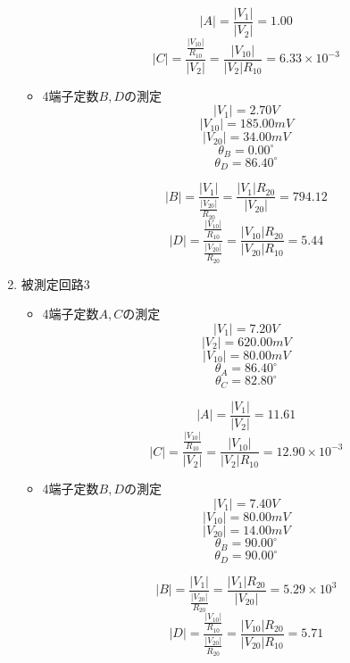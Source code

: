 \begin{enumerate}
\begin{itemize}
            $$
            |A|=\frac{\left|V_1\right|}{\left|V_2\right|}=1.00
            $$
            $$
            |C|=\frac{\frac{\left|V_{10}\right|}{R_{10}}}{\left|V_2\right|}=\frac{\left|V_{10}\right|}{\left|V_2\right| R_{10}}=6.33\times10^{-3}
            $$

            \item 4端子定数$B,D$の測定
            $$
            |V_1|=2.70V
            $$
            $$
            |V_{10}|=185.00mV
            $$
            $$
            |V_{20}|=34.00mV
            $$
            $$
            \theta_B=0.00^\circ
            $$
            $$
            \theta_D=86.40^\circ
            $$

            $$
            |B|=\frac{\left|V_1\right|}{\frac{\left|V_{20}\right|}{R_{20}}}=\frac{\left|V_1\right| R_{20}}{\left|V_{20}\right|}=794.12
            $$
            $$
            |D|=\frac{\frac{\left|V_{10}\right|}{R_{10}}}{\frac{\left|V_{20}\right|}{R_{20}}}=\frac{\left|V_{10}\right| R_{20}}{\left|V_{20}\right| R_{10}}=5.44
            $$
        \end{itemize}

        \newpage
        
        \item 被測定回路3
        \begin{itemize}
            \item 4端子定数$A,C$の測定
            $$
            |V_1|=7.20V
            $$
            $$
            |V_2|=620.00mV
            $$
            $$
            |V_{10}|=80.00mV
            $$
            $$
            \theta_A=86.40^\circ
            $$
            $$
            \theta_C=82.80^\circ
            $$

            $$
            |A|=\frac{\left|V_1\right|}{\left|V_2\right|}=11.61
            $$
            $$
            |C|=\frac{\frac{\left|V_{10}\right|}{R_{10}}}{\left|V_2\right|}=\frac{\left|V_{10}\right|}{\left|V_2\right| R_{10}}=12.90\times10^{-3}
            $$

            \item 4端子定数$B,D$の測定
            $$
            |V_1|=7.40V
            $$
            $$
            |V_{10}|=80.00mV
            $$
            $$
            |V_{20}|=14.00mV
            $$
            $$
            \theta_B=90.00^\circ
            $$
            $$
            \theta_D=90.00^\circ
            $$

            $$
            |B|=\frac{\left|V_1\right|}{\frac{\left|V_{20}\right|}{R_{20}}}=\frac{\left|V_1\right| R_{20}}{\left|V_{20}\right|}=5.29\times10^3
            $$
            $$
            |D|=\frac{\frac{\left|V_{10}\right|}{R_{10}}}{\frac{\left|V_{20}\right|}{R_{20}}}=\frac{\left|V_{10}\right| R_{20}}{\left|V_{20}\right| R_{10}}=5.71
            $$
        \end{itemize}
    \end{enumerate}

